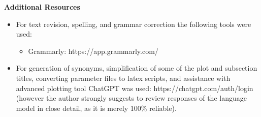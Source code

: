 \documentclass[../main.tex]{subfiles}
\begin{document}
\textbf{Additional Resources}
\begin{itemize}
    \item For text revision, spelling, and grammar correction the following tools were used:
    \begin{itemize}
        \item Grammarly: https://app.grammarly.com/
    \end{itemize}
    \item For generation of synonyms, simplification of some of the plot and subsection titles, converting parameter files to latex scripts, and assistance with advanced plotting tool ChatGPT was used: https://chatgpt.com/auth/login (however the author strongly suggests to review responses of the language model in close detail, as it is merely 100\% reliable).
\end{itemize}
\end{document}
